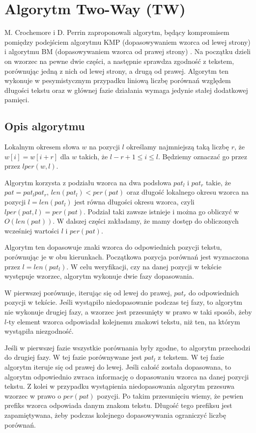 \newpage
\section{Algorytm Two-Way (TW)}
M. Crochemore i D. Perrin zaproponowali algorytm, będący kompromisem pomiędzy podejściem algorytmu KMP (dopasowywaniem wzorca od lewej strony) i algorytmu BM (dopasowywaniem wzorca od prawej strony) \cite{TW}. Na początku dzieli on wzorzec na pewne dwie części, a następnie sprawdza zgodność z tekstem, porównując jedną z nich od lewej strony, a drugą od prawej. Algorytm ten wykonuje w pesymistycznym przypadku liniową liczbę porównań względem długości tekstu oraz w głównej fazie działania wymaga jedynie stałej dodatkowej pamięci.

\subsection{Opis algorytmu}
\begin{definition}
Lokalnym okresem słowa $w$ na pozycji $l$ określamy najmniejszą taką liczbę $r$, że $w[i]=w[i+r]$ dla $w$ takich, że $l-r+1 \leq i \leq l$. Będziemy oznaczać go przez przez $lper(w,l)$. 
\end{definition}

Algorytm korzysta z podziału wzorca na dwa podsłowa $pat_{l}$ i $pat_{r}$ takie, że $pat = pat_{l}pat_{r}$, $len(pat_{l}) < per(pat)$ oraz długość lokalnego okresu wzorca na pozycji $l = len(pat_{l})$ jest równa długości okresu wzorca, czyli $lper(pat, l) = per(pat)$. Podział taki zawsze istnieje i można go obliczyć w $O(len(pat))$. W dalszej części zakładamy, że mamy dostęp do obliczonych wcześniej wartości $l$ i $per(pat)$.

Algorytm ten dopasowuje znaki wzorca do odpowiednich pozycji tekstu, porównując je w obu kierunkach. Początkowa pozycja porównań jest wyznaczona przez $l = len(pat_{l})$. W celu weryfikacji, czy na danej pozycji w tekście występuje wzorzec, algorytm wykonuje dwie fazy dopasowania. 

W pierwszej porównuje, iterując się od lewej do prawej, $pat_{r}$ do odpowiednich pozycji w tekście. Jeśli wystąpiło niedopasowanie podczas tej fazy, to algorytm nie wykonuje drugiej fazy, a wzorzec jest przesunięty w prawo w taki sposób, żeby $l$-ty element wzorca odpowiadał kolejnemu znakowi tekstu, niż ten, na którym wystąpiła niezgodność.

Jeśli w pierwszej fazie wszystkie porównania były zgodne, to algorytm przechodzi do drugiej fazy. W tej fazie porównywane jest $pat_{l}$ z tekstem. W tej fazie algorytm iteruje się od prawej do lewej. Jeśli całość została dopasowana, to algorytm odpowiednio zwraca informację o dopasowaniu wzorca na danej pozycji tekstu. Z kolei w przypadku wystąpienia niedopasowania algorytm przesuwa wzorzec w prawo o $per(pat)$ pozycji. Po takim przesunięciu wiemy, że pewien prefiks wzorca odpowiada danym znakom tekstu. Długość tego prefiksu jest zapamiętywana, żeby podczas kolejnego dopasowywania ograniczyć liczbę porównań.


